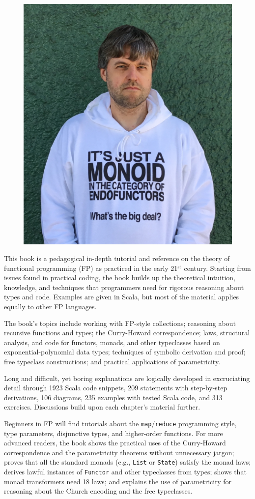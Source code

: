 \onecolumn
\thispagestyle{empty}
 
\begin{figure}
\includegraphics[width=0.4\columnwidth]{monads_evil_face}
\vspace{-2.0\baselineskip}
\end{figure}

\smaller
This book is a pedagogical in-depth tutorial and reference
on the theory of functional programming (FP) as practiced in the early
21$^{\text{st}}$ century. Starting from issues found in practical
coding, the book builds up the theoretical intuition, knowledge, and
techniques that programmers need for rigorous reasoning about types
and code. Examples are given in Scala, but most of the material applies equally
to other FP languages.

The book\textsf{'}s topics include working with FP-style collections; reasoning about recursive
functions and types; the Curry-Howard correspondence; laws, structural
analysis, and code for functors, monads, and other typeclasses based on exponential-polynomial data types; 
techniques of symbolic derivation and proof;
free typeclass constructions; and
practical applications of parametricity.

Long and difficult, yet boring explanations are logically
developed in excruciating detail through 1923
Scala code snippets, 209 statements with step-by-step
derivations, 106 diagrams, 235 examples
with tested Scala code, and 313 exercises. Discussions
build upon each chapter\textsf{'}s material further.

Beginners in FP will find tutorials about the \texttt{map}/\texttt{reduce}
programming style, type parameters, disjunctive types, and higher-order
functions. For more advanced readers, the book shows  the practical
uses of the Curry-Howard correspondence and the parametricity theorems
without unnecessary jargon; proves that all the standard monads (e.g.,
\texttt{List} or \texttt{State})
satisfy the monad laws; derives lawful instances of \texttt{Functor}
and other typeclasses from types; shows that monad transformers need
18 laws;
and explains the use of parametricity for reasoning about the Church encoding and the free typeclasses.

